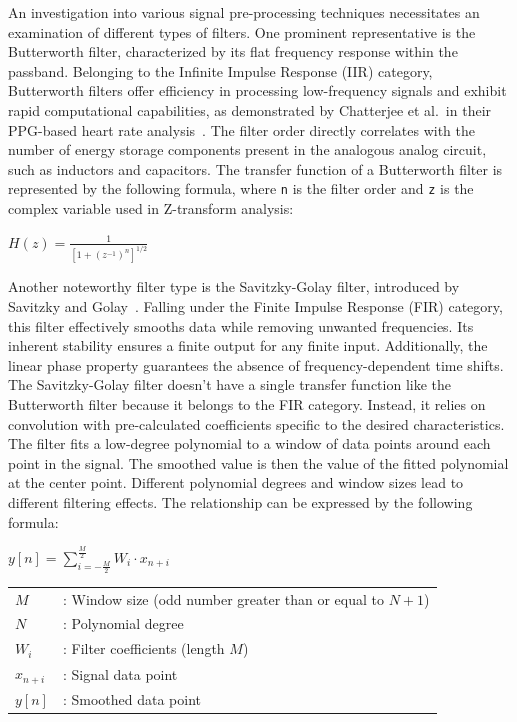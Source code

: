 An investigation into various signal pre-processing techniques necessitates an examination of different types of filters.
One prominent representative is the Butterworth filter, characterized by its flat frequency response within the passband.
Belonging to the Infinite Impulse Response (IIR) category, Butterworth filters offer efficiency in processing low-frequency signals and exhibit rapid computational capabilities, as demonstrated by Chatterjee et al.\ in their PPG-based heart rate analysis~\cite{chatterjeePPGBasedHeart2018}.
The filter order directly correlates with the number of energy storage components present in the analogous analog circuit, such as inductors and capacitors.
The transfer function of a Butterworth filter is represented by the following formula, where \texttt{n} is the filter order and \texttt{z} is the complex variable used in Z-transform analysis:

\Large
\begin{center}
    \begin{math}
        H(z) = \frac{1}{[1 + (z^{-1})^{n}]^{1/2}}
    \end{math}
\end{center}
\normalsize

Another noteworthy filter type is the Savitzky-Golay filter, introduced by Savitzky and Golay~\cite{savitzkySmoothingDifferentiationData1964}.
Falling under the Finite Impulse Response (FIR) category, this filter effectively smooths data while removing unwanted frequencies.
Its inherent stability ensures a finite output for any finite input.
Additionally, the linear phase property guarantees the absence of frequency-dependent time shifts.
The Savitzky-Golay filter doesn't have a single transfer function like the Butterworth filter because it belongs to the FIR category.
Instead, it relies on convolution with pre-calculated coefficients specific to the desired characteristics.
The filter fits a low-degree polynomial to a window of data points around each point in the signal.
The smoothed value is then the value of the fitted polynomial at the center point.
Different polynomial degrees and window sizes lead to different filtering effects.
The relationship can be expressed by the following formula:

\begin{center}
    \Large
    \begin{math}
        y[n] = \sum_{i=-\frac{M}{2}}^{\frac{M}{2}} W_i \cdot x_{n+i}
    \end{math}

    \normalsize
    \begin{tabular}{ll}
        $M$       & : Window size (odd number greater than or equal to $N+1$) \\
        $N$       & : Polynomial degree                                     \\
        $W_i$     & : Filter coefficients (length $M$)                        \\
        $x_{n+i}$ & : Signal data point                                     \\
        $y[n]$    & : Smoothed data point
    \end{tabular}
\end{center}

